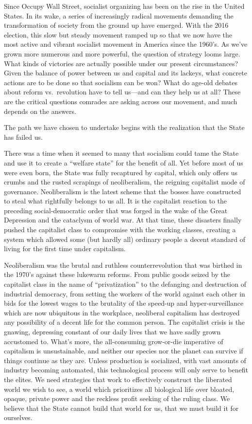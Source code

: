 \documentclass[10pt]{memoir}
\begin{document}
Since Occupy Wall Street, socialist organizing has been on the rise in
the United States. In its wake, a series of increasingly radical
movements demanding the transformation of society from the ground up
have emerged. With the 2016 election, this slow but steady movement
ramped up so that we now have the most active and vibrant socialist
movement in America since the 1960's. As we've grown more numerous and
more powerful, the question of strategy looms large. What kinds of
victories are actually possible under our present circumstances? Given
the balance of power between us and capital and its lackeys, what
concrete actions are to be done so that socialism can be won? What do
age-old debates about reform vs.~revolution have to tell us---and can
they help us at all? These are the critical questions comrades are
asking across our movement, and much depends on the answers.

The path we have chosen to undertake begins with the realization that
the State has failed us.

There was a time when it seemed to many that socialism could tame the
State and use it to create a ``welfare state'' for the benefit of all.
Yet before most of us were even born, the State was fully recaptured by
capital, which only offers us crumbs and the rusted scrapings of
neoliberalism, the reigning capitalist mode of governance. Neoliberalism
is the latest scheme that the bosses have constructed to steal what
rightfully belongs to us all. It is the capitalist reaction to the
preceding social-democratic order that was forged in the wake of the
Great Depression and the cataclysm of world war. At that time, these
disasters finally pushed the capitalist class to compromise with the
working classes, creating a system which allowed some (but hardly all)
ordinary people a decent standard of living for the first time under
capitalism.

Neoliberalism was the brutal and ruthless counterrevolution that was
birthed in the 1970's against these lukewarm reforms. From public goods
seized by the capitalist class in the name of ``privatization'' to the
defanging and destruction of industrial democracy, from setting the
workers of the world against each other in bids for the lowest wages to
the brutality of the speed-up and hyper-surveillance which are now
ubiquitous in the workplace, neoliberal capitalism has destroyed any
possibility of a decent life for the common person. The capitalist
crisis is the gnawing, depressing constant of our daily lives that we
have sadly grown accustomed to. What's more, the all-consuming
grow-or-die imperative of capitalism is unsustainable, and neither our
species nor the planet can survive if things continue as they are.
Unless production is socialized, with vast amounts of industry becoming
automated, this technological process will only serve to benefit the
elites. We need strategies that work to effectively construct the
liberated world we wish to see, a world which prioritizes all biological
life over bloated, opaque, private power and the reckless profit seeking
of the ruling class. We believe that the State cannot build that world
for us, that we must build it for ourselves.
\end{document}

